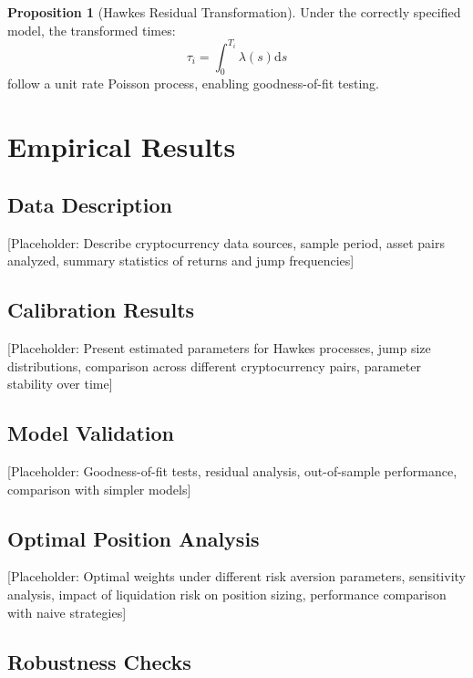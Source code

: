 \documentclass{article}
\newcommand{\diff}{\mathrm{d}}
\theoremstyle{definition}
\newtheorem{proposition}{Proposition}[section]
\begin{document}
\begin{proposition}[Hawkes Residual Transformation]
\label{prop:residuals}
Under the correctly specified model, the transformed times:
\begin{equation}
\tau_i = \int_0^{T_i} \lambda(s) \diff s
\end{equation}
follow a unit rate Poisson process, enabling goodness-of-fit testing.
\end{proposition}

\section{Empirical Results}

\subsection{Data Description}

[Placeholder: Describe cryptocurrency data sources, sample period, asset pairs analyzed, summary statistics of returns and jump frequencies]

\subsection{Calibration Results}

[Placeholder: Present estimated parameters for Hawkes processes, jump size distributions, comparison across different cryptocurrency pairs, parameter stability over time]

\subsection{Model Validation}

[Placeholder: Goodness-of-fit tests, residual analysis, out-of-sample performance, comparison with simpler models]

\subsection{Optimal Position Analysis}

[Placeholder: Optimal weights under different risk aversion parameters, sensitivity analysis, impact of liquidation risk on position sizing, performance comparison with naive strategies]

\subsection{Robustness Checks}
\end{document}
